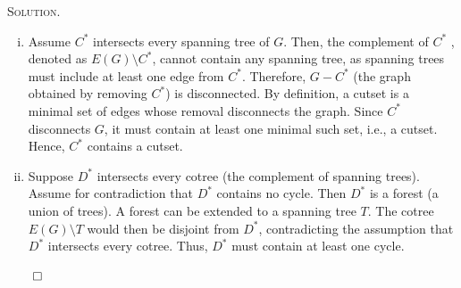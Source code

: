 \documentclass[12pt, a4paper, oneside]{ctexart}
\newenvironment{solution}{%
	\par\noindent\textsc{Solution. }\ignorespaces
}{%
	\hfill$\qed$\par
}
\begin{document}
    \begin{solution}
        \begin{enumerate}[(i)]
            \item Assume \( C^* \) intersects every spanning tree of \( G \). 
        Then, the complement of \( C^* \) , denoted as \( E(G) \setminus C^* \),
        cannot contain any spanning tree, as spanning trees must include 
        at least one edge from \( C^* \). Therefore, \( G - C^* \) 
        (the graph obtained by removing \( C^* \)) is disconnected. 
        By definition, a cutset is a minimal set of edges whose removal 
        disconnects the graph. Since \( C^* \) disconnects \( G \), 
        it must contain at least one minimal such set, i.e., a cutset. 
        Hence, \( C^* \) contains a cutset.
            \item Suppose \( D^* \) intersects every cotree (the complement of spanning trees). 
            Assume for contradiction that \( D^* \) contains no cycle. 
            Then \( D^* \) is a forest (a union of trees). 
            A forest can be extended to a spanning tree \( T \). 
            The cotree \( E(G) \setminus T \) would then be disjoint 
            from \( D^* \), contradicting the assumption that \( D^* \) 
            intersects every cotree. Thus, \( D^* \) must contain 
            at least one cycle.

        \end{enumerate}
        



    \end{solution}
\end{document}
